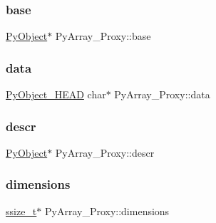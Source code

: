 \subsubsection{\texorpdfstring{base}{base}}
{\footnotesize\ttfamily \mbox{\hyperlink{_python27_2object_8h_aadc84ac7aed2cfa6f20c25f62bf3dac7}{Py\+Object}}$\ast$ Py\+Array\+\_\+\+Proxy\+::base}

\mbox{\label{struct_py_array___proxy_ad09936736edcfb5eae60e35bdc56e21d}} 
\subsubsection{\texorpdfstring{data}{data}}
{\footnotesize\ttfamily \mbox{\hyperlink{_python27_2object_8h_a0bf35c1f3ea13f925de94d8593db3b7e}{Py\+Object\+\_\+\+H\+E\+AD}} char$\ast$ Py\+Array\+\_\+\+Proxy\+::data}

\mbox{\label{struct_py_array___proxy_a61adbd0c265ff6e68f5d38d977179f2a}} 
\subsubsection{\texorpdfstring{descr}{descr}}
{\footnotesize\ttfamily \mbox{\hyperlink{_python27_2object_8h_aadc84ac7aed2cfa6f20c25f62bf3dac7}{Py\+Object}}$\ast$ Py\+Array\+\_\+\+Proxy\+::descr}

\mbox{\label{struct_py_array___proxy_aaa6b3bbe3a72225a728f4d3af9ce828a}} 
\subsubsection{\texorpdfstring{dimensions}{dimensions}}
{\footnotesize\ttfamily \mbox{\hyperlink{detail_2common_8h_ac430d16fc097b3bf0a7469cfd09decda}{ssize\+\_\+t}}$\ast$ Py\+Array\+\_\+\+Proxy\+::dimensions}

\mbox{\label{struct_py_array___proxy_a3eb84eade4ac85d3964c89b9b8a8645b}} 
